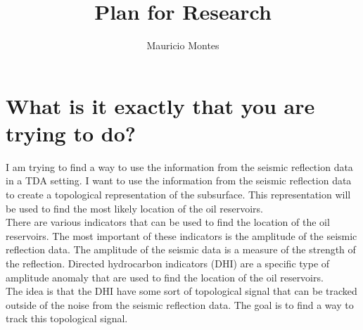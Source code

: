 \documentclass{article}
\begin{document}
\setlength{\parindent}{6pt}


\title{Plan for Research}

\author{Mauricio Montes}

\maketitle

\section{What is it exactly that you are trying to do?}

I am trying to find a way to use the information from the seismic reflection data in a TDA setting.
I want to use the information from the seismic reflection data to create a topological representation of the subsurface.
This representation will be used to find the most likely location of the oil reservoirs. \\ There are
various indicators that can be used to find the location of the oil reservoirs. The most important
of these indicators is the amplitude of the seismic reflection data. The amplitude of the seismic
data is a measure of the strength of the reflection. Directed hydrocarbon indicators (DHI) are a
specific type of amplitude anomaly that are used to find the location of the oil reservoirs. \\ The
idea is that the DHI have some sort of topological signal that can be tracked outside of the noise
from the seismic reflection data. The goal is to find a way to track this topological signal.
\end{document}
